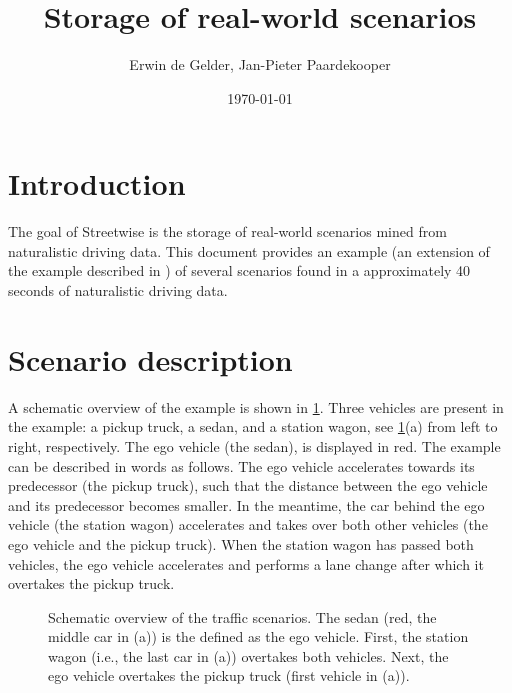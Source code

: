 \documentclass[10pt,final,a4paper,oneside,onecolumn]{article}
\def\reptitle{Storage of real-world scenarios}
\def\repauthor{Erwin de Gelder, Jan-Pieter Paardekooper}
\newlength\figurewidth
\newlength\figureheight
\theoremstyle{plain}\newtheorem{definition}{Definition}[section]    %
\theoremstyle{definition}\newtheorem{example}{Example}[section]     %
\theoremstyle{remark}\newtheorem{remarkenv}{Remark}[section]        %
\begin{document}

\title{\textbf{\reptitle}}
\author{\repauthor}
\date{\today}
\maketitle

\tableofcontents

\newpage

\section{Introduction}
\label{sec:introduction}

The goal of Streetwise is the storage of real-world scenarios mined from naturalistic driving data. This document provides an example (an extension of the example described in \cite{degelder2018ontology}) of several scenarios found in a approximately 40 seconds of naturalistic driving data.


\section{Scenario description}

A schematic overview of the example is shown in \cref{fig:example schematic}. Three vehicles are present in the example: a pickup truck, a sedan, and a station wagon, see \cref{fig:example schematic}(a) from left to right, respectively. The ego vehicle (the sedan), is displayed in red. The example can be described in words as follows. The ego vehicle accelerates towards its predecessor (the pickup truck), such that the distance between the ego vehicle and its predecessor becomes smaller. In the meantime, the car behind the ego vehicle (the station wagon) accelerates and takes over both other vehicles (the ego vehicle and the pickup truck). When the station wagon has passed both vehicles, the ego vehicle accelerates and performs a lane change after which it overtakes the pickup truck.

\setlength\figureheight{106pt}
\setlength\figurewidth{260pt}
\begin{figure}[b]
	\begin{minipage}[b]{\linewidth}
		\centering
	\end{minipage}
	\setlength\figureheight{100pt}
	\begin{minipage}[b]{\linewidth}
		\centering
	\end{minipage}
	\caption{Schematic overview of the traffic scenarios. The sedan (red, the middle car in (a)) is the defined as the ego vehicle. First, the station wagon (i.e., the last car in (a)) overtakes both vehicles. Next, the ego vehicle overtakes the pickup truck (first vehicle in (a)).}
	\label{fig:example schematic}
\end{figure}
\end{document}
